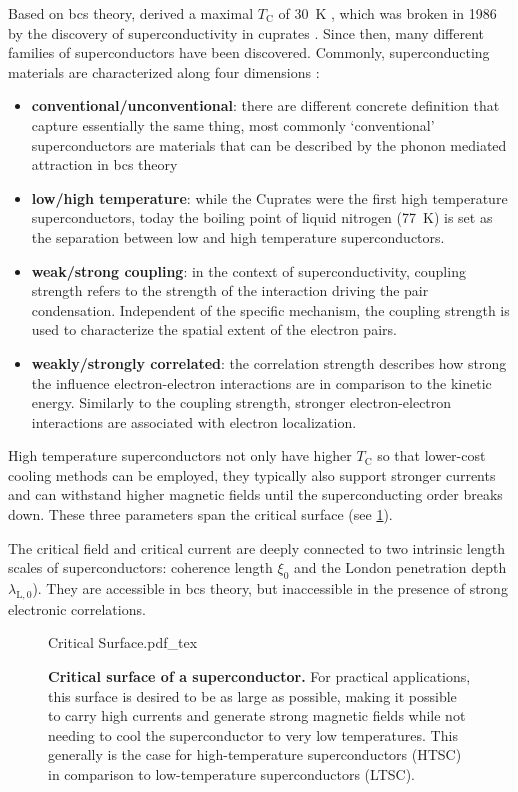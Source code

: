 \documentclass[../notes.tex]{subfiles}
\begin{document}
Based on \gls{bcs} theory, \citeauthor{cohenCommentsMaximumSuperconducting1972} derived a maximal \(T_{\mathrm{C}}\) of \qty{30}{\kelvin} \cite{cohenCommentsMaximumSuperconducting1972}, which was broken in 1986 by the discovery of superconductivity in cuprates \cite{bednorzPossibleHighTc1986,uchidaHighTcSuperconductivity1987}.
Since then, many different families of superconductors have been discovered.
Commonly, superconducting materials are characterized along four dimensions \cite{wittElectronCorrelationsUnconventional}:
\begin{itemize}
	\item \textbf{conventional/unconventional}: there are different concrete definition that capture essentially the same thing, most commonly `conventional' superconductors are materials that can be described by the phonon mediated attraction in \gls{bcs} theory
	\item \textbf{low/high temperature}: while the Cuprates were the first high temperature superconductors, today the boiling point of liquid nitrogen (\qty{77}{\kelvin}) is set as the separation between low and high temperature superconductors.
	\item \textbf{weak/strong coupling}: in the context of superconductivity, coupling strength refers to the strength of the interaction driving the pair condensation. Independent of the specific mechanism, the coupling strength is used to characterize the spatial extent of the electron pairs.
	\item \textbf{weakly/strongly correlated}: the correlation strength describes how strong the influence electron-electron interactions are in comparison to the kinetic energy. Similarly to the coupling strength, stronger electron-electron interactions are associated with electron localization.
\end{itemize}
High temperature superconductors not only have higher \(T_{\mathrm{C}}\) so that lower-cost cooling methods can be employed, they typically also support stronger currents and can withstand higher magnetic fields until the superconducting order breaks down.
These three parameters span the critical surface (see \cref{fig:Critical Surface of a SC}).

The critical field and critical current are deeply connected to two intrinsic length scales of superconductors: coherence length \(\xi_0\) and the London penetration depth \(\lambda_{\mathrm{L}, 0}\)).
They are accessible in \gls{bcs} theory, but inaccessible in the presence of strong electronic correlations.
\begin{figure}
	\centering
	{Critical Surface.pdf_tex}
	\caption[Critical surface of a superconductor.]{\textbf{Critical surface of a superconductor.} For practical applications, this surface is desired to be as large as possible, making it possible to carry high currents and generate strong magnetic fields while not needing to cool the superconductor to very low temperatures. This generally is the case for high-temperature superconductors (HTSC) in comparison to low-temperature superconductors (LTSC).}
	\label{fig:Critical Surface of a SC}
\end{figure}
\end{document}
